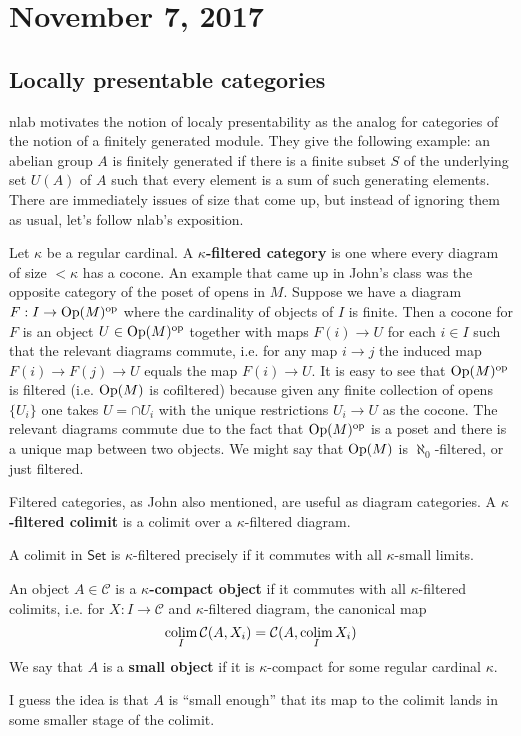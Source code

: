 \documentclass{amsart}
\newcommand{\op}{\text{op}}
\begin{document}
\section{November 7, 2017}

\subsection{Locally presentable categories}

nlab motivates the notion of localy presentability as the analog for categories
of the notion of a finitely generated module. They give the following example:
an abelian group $A$ is finitely generated if there is a finite subset $S$ of the
underlying set $U(A)$ of $A$ such that every element is a sum of such generating
elements. There are immediately issues of size that come up, but instead of
ignoring them as usual, let's follow nlab's exposition.

Let $\kappa$ be a regular cardinal. A \textbf{$\kappa$-filtered category} is one
where every diagram of size $<\kappa$ has a cocone. An example that came up in
John's class was the opposite category of the poset of opens in $M$. Suppose we
have a diagram $F:I\to \Op(M)^\op$ where the cardinality of objects of $I$ is finite.
Then a cocone for $F$ is an object $U\in\Op(M)^\op$ together with maps $F(i)\to U$
for each $i\in I$ such that the relevant diagrams commute, i.e. for any map
$i\to j$ the induced map $F(i)\to F(j)\to U$ equals the map $F(i)\to U$.
It is easy to see that $\Op(M)^\op$ is filtered (i.e. $\operatorname{Op}(M)$ is cofiltered) because
given any finite collection of opens $\{U_i\}$ one takes $U=\cap U_i$ with
the unique restrictions $U_i\to U$ as the cocone. The relevant diagrams commute
due to the fact that $\Op(M)^\op$ is a poset and there is a unique map between
two objects. We might say that $\operatorname{Op}(M)$ is $\aleph_0$-filtered, or just filtered.

Filtered categories, as John also mentioned, are useful as diagram categories.
A \textbf{$\kappa$-filtered colimit} is a colimit over a $\kappa$-filtered diagram.
\begin{proposition}
    A colimit in $\mathsf{Set}$ is $\kappa$-filtered precisely if it commutes with
    all $\kappa$-small limits.
\end{proposition}

\begin{definition}
    An object $A\in\mathcal{C}$ is a \textbf{$\kappa$-compact object} if it
    commutes with all $\kappa$-filtered colimits, i.e. for $X:I\to \mathcal{C}$
    and $\kappa$-filtered diagram, the canonical map
    \begin{equation*}
        \operatorname*{colim}_I \mathcal{C}(A, X_i) = \mathcal{C}(A, \operatorname*{colim}_I X_i)
    \end{equation*}
    We say that $A$ is a \textbf{small object} if it is $\kappa$-compact for some
    regular cardinal $\kappa$.
\end{definition}
I guess the idea is that $A$ is ``small enough'' that its map to the colimit
lands in some smaller stage of the colimit.
\end{document}
